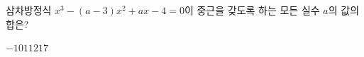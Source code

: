 삼차방정식 $x^3-(a-3)x^2+ax-4=0$이 중근을 갖도록 하는 모든 실수 $a$의 값의 합은?
\begin{choices32}{$-1$}{$0$}{$1$}{$12$}{$17$}\end{choices32}
